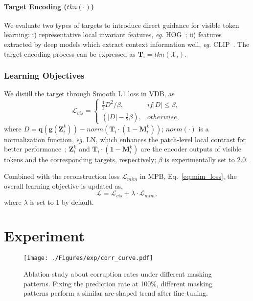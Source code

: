 \documentclass[lettersize,journal]{IEEEtran}
\begin{document}
\paragraph{Target Encoding ($tkn(\cdot)$)}
We evaluate two types of targets to introduce direct guidance for visible token learning: i) representative local invariant features, \textit{eg.} HOG~\cite{Dalal2005HistogramsOO}; ii) features extracted by deep models which extract context information well, \textit{eg.} CLIP~\cite{Radford2021LearningTV}. The target encoding process can be expressed as $\bm{T}_i=tkn(\mathcal{X}_i)$.

\subsubsection{Learning Objectives}
We distill the target through Smooth L1 loss in VDB, as
\begin{equation}
\mathcal{L}_{vis}=\left\{
    \begin{array}{ll}
        \frac{1}{2} D^2/\beta ,&  if \left\lvert D\right\rvert \leq  \beta ,\\
        (\left\lvert D\right\rvert -  \frac{1}{2}\beta ) ,& otherwise,
    \end{array}
    \right.
\end{equation}
where $D=\bm{q}(\bm{g}(\bm{Z}_{i}^{k}))-norm(\bm{T}_i \cdot (\bm{1}- \bm{M}_{i}^k))$; $norm(\cdot)$ is a normalization function, \textit{eg.} LN, which enhances the patch-level local contrast for better performance~\cite{2021arXiv211106377H}; $\bm{Z}_{i}^{k}$ and $\bm{T}_i \cdot (\bm{1}- \bm{M}_{i}^k)$ are the encoder outputs of visible tokens and the corresponding targets, respectively;  $\beta$ is experimentally set to 2.0.

Combined with the reconstruction loss $\mathcal{L}_{mim}$ in MPB, Eq.~\ref{eq:mim_loss}, the overall learning objective is updated as,
\begin{equation}
\mathcal{L} = \mathcal{L}_{vis} + \lambda \cdot \mathcal{L}_{mim},
\end{equation}
where $\lambda$ is set to 1 by default. 

\section{Experiment}

\begin{figure}[!t]
\centering
    \texttt{[image: ./Figures/exp/corr\_curve.pdf]}
    \caption{Ablation study about corruption rates under different masking patterns. Fixing the prediction rate at 100$\%$, different masking patterns perform a similar arc-shaped trend after fine-tuning.}
   \label{fig:m_patt}
\end{figure}
\end{document}
